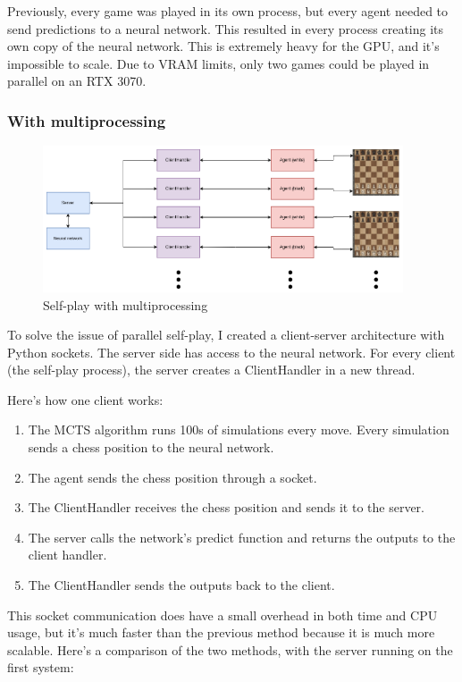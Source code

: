 \documentclass{article}
\begin{document}
Previously, every game was played in its own process, but every agent needed to send predictions to a neural network.
This resulted in every process creating its own copy of the neural network. This is extremely heavy for the GPU, and
it's impossible to scale. Due to VRAM limits, only two games could be played in parallel on an RTX 3070.

\subsubsection{With multiprocessing}

\begin{figure}[H]
    \centering
    \includegraphics[width=0.95\textwidth]{img/with-multiprocessing.png}
    \caption{Self-play with multiprocessing}
\end{figure}

To solve the issue of parallel self-play, I created a client-server architecture with Python sockets.
The server side has access to the neural network. For every client (the self-play process), 
the server creates a ClientHandler in a new thread.

Here's how one client works:

\begin{enumerate}
    \item The MCTS algorithm runs 100s of simulations every move. Every simulation sends a chess position to the neural network.
    \item The agent sends the chess position through a socket.
    \item The ClientHandler receives the chess position and sends it to the server.
    \item The server calls the network's predict function and returns the outputs to the client handler.
    \item The ClientHandler sends the outputs back to the client.
\end{enumerate}

This socket communication does have a small overhead in both time and CPU usage, but it's much faster than the previous method
because it is much more scalable. Here's a comparison of the two methods, with the server running on the first system:
\end{document}
